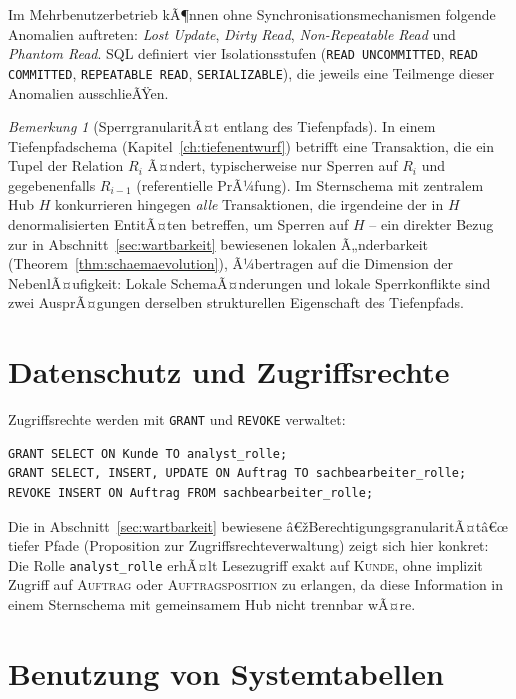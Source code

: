 ﻿\documentclass[a4paper,12pt]{report}
\theoremstyle{definition}
\theoremstyle{remark}
\newtheorem{remark}{Bemerkung}[chapter]
\begin{document}
Im Mehrbenutzerbetrieb kÃ¶nnen ohne Synchronisationsmechanismen folgende
Anomalien auftreten: \emph{Lost Update}, \emph{Dirty Read},
\emph{Non-Repeatable Read} und \emph{Phantom Read}. SQL definiert vier
Isolationsstufen (\texttt{READ UNCOMMITTED}, \texttt{READ COMMITTED},
\texttt{REPEATABLE READ}, \texttt{SERIALIZABLE}), die jeweils eine
Teilmenge dieser Anomalien ausschlieÃŸen.

\begin{remark}[SperrgranularitÃ¤t entlang des Tiefenpfads]
\label{rem:sperren}
In einem Tiefenpfadschema (Kapitel~\ref{ch:tiefenentwurf}) betrifft eine
Transaktion, die ein Tupel der Relation $R_i$ Ã¤ndert, typischerweise nur
Sperren auf $R_i$ und gegebenenfalls $R_{i-1}$ (referentielle
PrÃ¼fung). Im Sternschema mit zentralem Hub $H$ konkurrieren hingegen
\emph{alle} Transaktionen, die irgendeine der in $H$ denormalisierten
EntitÃ¤ten betreffen, um Sperren auf $H$ -- ein direkter Bezug zur in
Abschnitt~\ref{sec:wartbarkeit} bewiesenen lokalen Ã„nderbarkeit
(Theorem~\ref{thm:schaemaevolution}), Ã¼bertragen auf die Dimension der
NebenlÃ¤ufigkeit: Lokale SchemaÃ¤nderungen und lokale Sperrkonflikte sind
zwei AusprÃ¤gungen derselben strukturellen Eigenschaft des
Tiefenpfads.
\end{remark}

\section{Datenschutz und Zugriffsrechte}
\label{sec:zugriffsrechte}

Zugriffsrechte werden mit \texttt{GRANT} und \texttt{REVOKE} verwaltet:

\begin{lstlisting}
GRANT SELECT ON Kunde TO analyst_rolle;
GRANT SELECT, INSERT, UPDATE ON Auftrag TO sachbearbeiter_rolle;
REVOKE INSERT ON Auftrag FROM sachbearbeiter_rolle;
\end{lstlisting}

Die in Abschnitt~\ref{sec:wartbarkeit} bewiesene
â€žBerechtigungsgranularitÃ¤tâ€œ tiefer Pfade (Proposition zur
Zugriffsrechteverwaltung) zeigt sich hier konkret: Die Rolle
\texttt{analyst\_rolle} erhÃ¤lt Lesezugriff exakt auf
\textsc{Kunde}, ohne implizit Zugriff auf \textsc{Auftrag} oder
\textsc{Auftragsposition} zu erlangen, da diese Information in einem
Sternschema mit gemeinsamem Hub nicht trennbar wÃ¤re.

\section{Benutzung von Systemtabellen}
\label{sec:systemtabellen}
\end{document}

